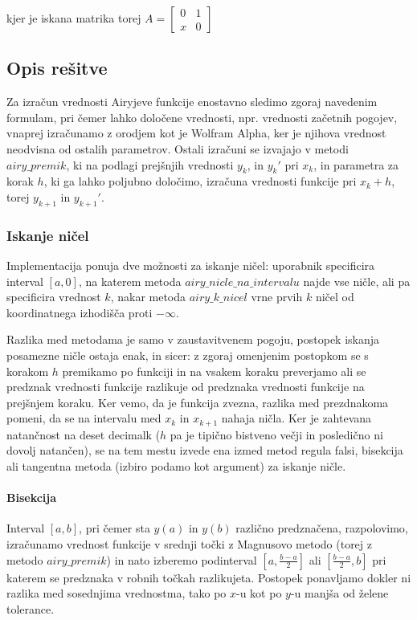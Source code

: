 \documentclass[12pt,a4paper]{article}
\begin{document}
kjer je iskana matrika torej $A=\begin{bmatrix}0 & 1 \\ x & 0\end{bmatrix}$


\subsection{Opis rešitve}
Za izračun vrednosti Airyjeve funkcije enostavno sledimo zgoraj navedenim formulam, pri čemer lahko določene vrednosti, npr. vrednosti začetnih pogojev, vnaprej izračunamo z orodjem kot je Wolfram Alpha, ker je njihova vrednost neodvisna od ostalih parametrov. Ostali izračuni se izvajajo v metodi $\textit{airy\_premik}$, ki na podlagi prejšnjih vrednosti $y_k$, in $y_k'$ pri $x_k$, in parametra za korak $h$, ki ga lahko poljubno določimo, izračuna vrednosti funkcije pri $x_k+h$,  torej $y_{k+1}$ in $y_{k+1}'$.


\subsubsection{Iskanje ničel}
Implementacija ponuja dve možnosti za iskanje ničel: uporabnik specificira interval $[a,0]$, na katerem  metoda $\textit{airy\_nicle\_na\_intervalu}$ najde vse ničle, ali pa specificira vrednost $k$, nakar  metoda $\textit{airy\_k\_nicel}$ vrne prvih $k$ ničel od koordinatnega izhodišča proti $-\infty$.


Razlika med metodama je samo v zaustavitvenem pogoju, postopek iskanja posamezne ničle ostaja enak, in sicer: z zgoraj omenjenim postopkom se s korakom $h$ premikamo po funkciji in na vsakem koraku preverjamo ali se predznak vrednosti funkcije razlikuje od predznaka vrednosti funkcije na prejšnjem koraku. Ker vemo, da je funkcija zvezna, razlika med prezdnakoma pomeni,  da se na intervalu med $x_k$ in $x_{k+1}$ nahaja ničla. Ker je zahtevana natančnost na deset decimalk ($h$ pa je tipično bistveno večji  in posledično ni dovolj natančen), se na tem mestu izvede ena izmed metod regula falsi, bisekcija ali tangentna metoda  (izbiro podamo kot argument) za iskanje ničle.


\paragraph{Bisekcija}
Interval $[a, b]$, pri čemer sta $y(a)$ in $y(b)$ različno predznačena, razpolovimo, izračunamo vrednost funkcije v srednji točki z Magnusovo metodo (torej z metodo $\textit{airy\_premik}$) in nato izberemo podinterval $[a, \frac{b-a}{2}]$ ali $[\frac{b-a}{2}, b]$ pri katerem se predznaka v robnih točkah razlikujeta. Postopek ponavljamo dokler ni razlika med sosednjima vrednostma, tako po $x$-u  kot po $y$-u manjša od želene tolerance. 
\end{document}
